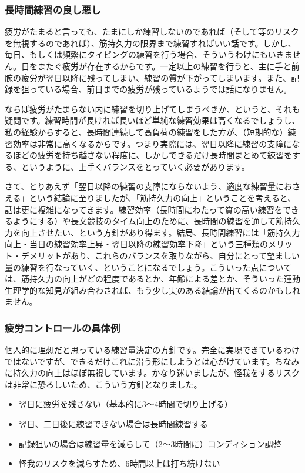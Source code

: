\subsubsection*{長時間練習の良し悪し}

疲労がたまると言っても、たまにしか練習しないのであれば（そして等のリスクを無視するのであれば）、筋持久力の限界まで練習すればいい話です。しかし、毎日、もしくは頻繁にタイピングの練習を行う場合、そういうわけにもいきません。日をまたぐ疲労が存在するからです。一定以上の練習を行うと、主に手と前腕の疲労が翌日以降に残ってしまい、練習の質が下がってしまいます。また、記録を狙っている場合、前日までの疲労が残っているようでは話になりません。

ならば疲労がたまらない内に練習を切り上げてしまうべきか、というと、それも疑問です。練習時間が長ければ長いほど単純な練習効果は高くなるでしょうし、私の経験からすると、長時間連続して高負荷の練習をした方が、（短期的な）練習効率は非常に高くなるからです。つまり実際には、翌日以降に練習の支障になるほどの疲労を持ち越さない程度に、しかしできるだけ長時間まとめて練習をする、というように、上手くバランスをとっていく必要があります。

さて、とりあえず「翌日以降の練習の支障にならないよう、適度な練習量におさえる」という結論に至りましたが、「筋持久力の向上」ということを考えると、話は更に複雑になってきます。練習効率（長時間にわたって質の高い練習をできるようにする）や長文競技のタイム向上のために、長時間の練習を通して筋持久力を向上させたい、という方針があり得ます。結局、長時間練習には「筋持久力向上・当日の練習効率上昇・翌日以降の練習効率下降」という三種類のメリット・デメリットがあり、これらのバランスを取りながら、自分にとって望ましい量の練習を行なっていく、ということになるでしょう。こういった点については、筋持久力の向上がどの程度であるとか、年齢による差とか、そういった運動生理学的な知見が組み合わされば、もう少し実のある結論が出てくるのかもしれません。

\subsubsection*{疲労コントロールの具体例}

個人的に理想だと思っている練習量決定の方針です。完全に実現できているわけではないですが、できるだけこれに沿う形にしようとは心がけています。ちなみに持久力の向上はほぼ無視しています。かなり迷いましたが、怪我をするリスクは非常に恐ろしいため、こういう方針となりました。

\begin{itemize}
 \item 翌日に疲労を残さない（基本的に3～4時間で切り上げる）
 \item 翌日、二日後に練習できない場合は長時間練習する
 \item 記録狙いの場合は練習量を減らして（2～3時間に）コンディション調整
 \item 怪我のリスクを減らすため、6時間以上は打ち続けない
\end{itemize}

